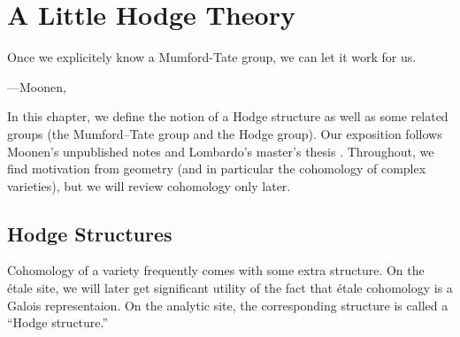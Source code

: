 \documentclass[../thesis.tex]{subfiles}
\begin{document}
\chapter{A Little Hodge Theory} \label{chap:hodge}

\epigraph{Once we explicitely know a Mumford-Tate group, we can let it work for us.}
{---Moonen, \cite[(5.5)]{moonen-mumford-tate-intro}}

In this chapter, we define the notion of a Hodge structure as well as some related groups (the Mumford--Tate group and the Hodge group). Our exposition follows Moonen's unpublished notes \cite{moonen-mumford-tate-intro,moonen-mumford-tate} and Lombardo's master's thesis \cite[Chapter~3]{lombardo-mumford-tate}. Throughout, we find motivation from geometry (and in particular the cohomology of complex varieties), but we will review cohomology only later.

\section{Hodge Structures}
Cohomology of a variety frequently comes with some extra structure. On the \'etale site, we will later get significant utility of the fact that \'etale cohomology is a Galois representaion. On the analytic site, the corresponding structure is called a ``Hodge structure.''
\end{document}
